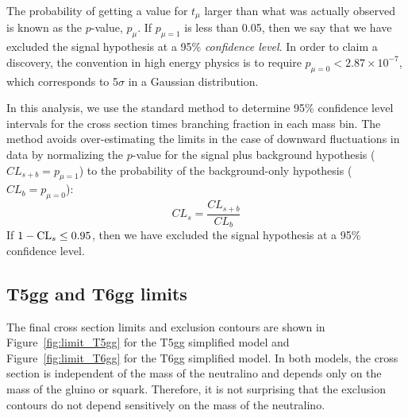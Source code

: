 The probability of getting a value for $t_\mu$ larger than what was actually observed is known as the $p$-value, 
$p_\mu$. If $p_{\mu=1}$ is less than 0.05, then we say that we have excluded the signal hypothesis at a 95\% 
\textit{confidence level}. In order to claim a discovery, the convention in high energy physics is to require
$p_{\mu =0} < 2.87 \times 10^{-7}$, which corresponds to 5$\sigma$ in a Gaussian distribution. 

In this analysis, we use the standard \cls method \cite{Junk:1999kv, Read:2002hq} to 
determine 95\% confidence level intervals for the cross section times branching fraction in each mass bin.
The \cls method avoids over-estimating the limits in the case of downward fluctuations in data by
normalizing the $p$-value for the signal plus background hypothesis ($CL_{s+b} = p_{\mu=1}$) to the
probability of the background-only hypothesis ($CL_{b} = p_{\mu=0}$):
\begin{equation}
CL_s = \frac{CL_{s+b}}{CL_{b}}
\end{equation}
If $1 - \mathrm{CL}_s \leq 0.95$, then we have excluded the signal hypothesis at a 95\% confidence level.

\subsection{T5gg and T6gg limits}
\label{sec:limitResults}

The final cross section limits and exclusion contours are shown in Figure~\ref{fig:limit_T5gg} for the T5gg simplified model
and Figure~\ref{fig:limit_T6gg} for the T6gg simplified model.
In both models, the cross section is independent of the mass of the neutralino and 
depends only on the mass of the gluino or squark. Therefore, it is not surprising that the exclusion contours
do not depend sensitively on the mass of the neutralino. 

